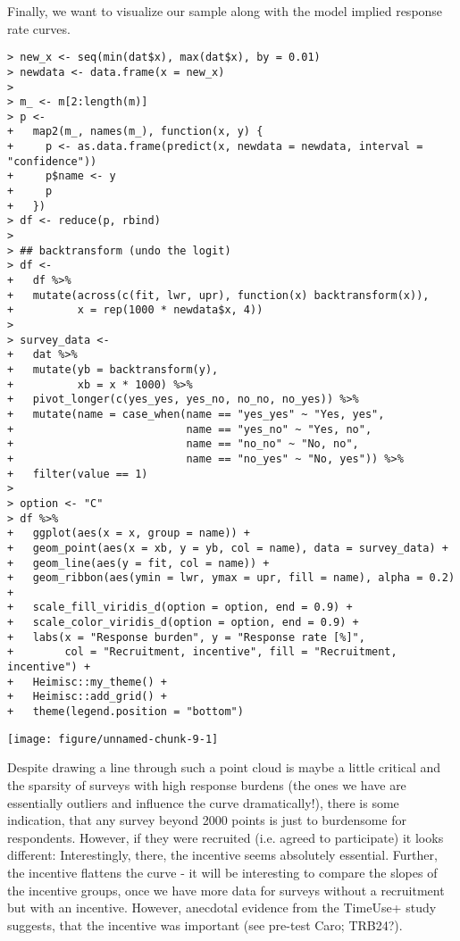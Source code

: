 \documentclass[a4paper]{article}\usepackage[]{graphicx}\usepackage[]{xcolor}
\makeatletter
\def\maxwidth{ %
  \ifdim\Gin@nat@width>\linewidth
    \linewidth
  \else
    \Gin@nat@width
  \fi
}
\newenvironment{kframe}{%
 \def\at@end@of@kframe{}%
 \ifinner\ifhmode%
  \def\at@end@of@kframe{\end{minipage}}%
  \begin{minipage}{\columnwidth}%
 \fi\fi%
 \def\FrameCommand##1{\hskip\@totalleftmargin \hskip-\fboxsep
 \colorbox{shadecolor}{##1}\hskip-\fboxsep
     \hskip-\linewidth \hskip-\@totalleftmargin \hskip\columnwidth}%
 \MakeFramed {\advance\hsize-\width
   \@totalleftmargin\z@ \linewidth\hsize
   \@setminipage}}%
 {\par\unskip\endMakeFramed%
 \at@end@of@kframe}
\newenvironment{knitrout}{}{} %
\makeatother
\begin{document}
Finally, we want to visualize our sample along with the model implied response rate curves.

\begin{knitrout}
\color{fgcolor}\begin{kframe}
\begin{verbatim}
> new_x <- seq(min(dat$x), max(dat$x), by = 0.01)
> newdata <- data.frame(x = new_x)
> 
> m_ <- m[2:length(m)]
> p <-
+   map2(m_, names(m_), function(x, y) {
+     p <- as.data.frame(predict(x, newdata = newdata, interval = "confidence"))
+     p$name <- y
+     p
+   })
> df <- reduce(p, rbind)
> 
> ## backtransform (undo the logit)
> df <-
+   df %>%
+   mutate(across(c(fit, lwr, upr), function(x) backtransform(x)),
+          x = rep(1000 * newdata$x, 4))
> 
> survey_data <-
+   dat %>%
+   mutate(yb = backtransform(y),
+          xb = x * 1000) %>%
+   pivot_longer(c(yes_yes, yes_no, no_no, no_yes)) %>%
+   mutate(name = case_when(name == "yes_yes" ~ "Yes, yes",
+                           name == "yes_no" ~ "Yes, no",
+                           name == "no_no" ~ "No, no",
+                           name == "no_yes" ~ "No, yes")) %>%
+   filter(value == 1)
> 
> option <- "C"
> df %>%
+   ggplot(aes(x = x, group = name)) +
+   geom_point(aes(x = xb, y = yb, col = name), data = survey_data) +
+   geom_line(aes(y = fit, col = name)) +
+   geom_ribbon(aes(ymin = lwr, ymax = upr, fill = name), alpha = 0.2) +
+   scale_fill_viridis_d(option = option, end = 0.9) +
+   scale_color_viridis_d(option = option, end = 0.9) +
+   labs(x = "Response burden", y = "Response rate [%]",
+        col = "Recruitment, incentive", fill = "Recruitment, incentive") +
+   Heimisc::my_theme() +
+   Heimisc::add_grid() +
+   theme(legend.position = "bottom")
\end{verbatim}
\end{kframe}
\texttt{[image: figure/unnamed-chunk-9-1]} 
\end{knitrout}

Despite drawing a line through such a point cloud is maybe a little critical and the sparsity of surveys with high response burdens (the ones we have are essentially outliers and influence the curve dramatically!), there is some indication, that any survey beyond 2000 points is just to burdensome for respondents. However, if they were recruited (i.e. agreed to participate) it looks different: Interestingly, there, the incentive seems absolutely essential. Further, the incentive flattens the curve - it will be interesting to compare the slopes of the incentive groups, once we have more data for surveys without a recruitment but with an incentive. However, anecdotal evidence from the TimeUse+ study suggests, that the incentive was important (see pre-test Caro; TRB24?).




% 
\end{document}
